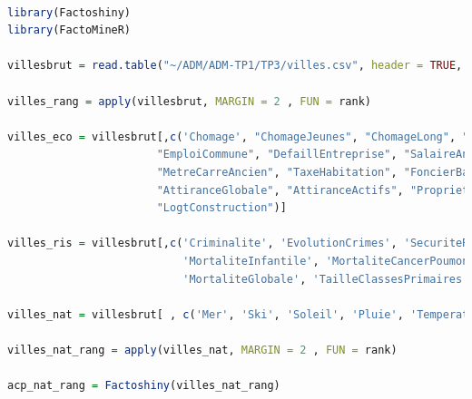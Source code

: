 \documentclass{article}
\begin{document}
\begin{lstlisting}[language=R]

library(Factoshiny)
library(FactoMineR)

villesbrut = read.table("~/ADM/ADM-TP1/TP3/villes.csv", header = TRUE, row.names=1)

villes_rang = apply(villesbrut, MARGIN = 2 , FUN = rank)

villes_eco = villesbrut[,c('Chomage', "ChomageJeunes", "ChomageLong", "EvoluEmploiCree", "Activite", "EmploiFeminin",
                       "EmploiCommune", "DefaillEntreprise", "SalaireAnnuel", "ImpotRevenu", "ImpotFortune", "Imposables",
                       "MetreCarreAncien", "TaxeHabitation", "FoncierBati", "MetreCubeEau", "EvolDemographique", "Vieillissement",
                       "AttiranceGlobale", "AttiranceActifs", "Proprietaires", "LogtSup4pieces", "LogtInsalubre", "LogtVacant",
                       "LogtConstruction")]

villes_ris = villesbrut[,c('Criminalite', 'EvolutionCrimes', 'SecuriteRoutiere', 'Inondations', 'TerrainsPollues', 'UsinesRisques',
                           'MortaliteInfantile', 'MortaliteCancerPoumon', 'MortaliteAlcool', 'DecesInfarctus', 'TauxSuicide',
                           'MortaliteGlobale', 'TailleClassesPrimaires', 'Retard6eme', 'Retard3eme', 'RetardTerminale')]

villes_nat = villesbrut[ , c('Mer', 'Ski', 'Soleil', 'Pluie', 'Temperature', 'MarcheAPied')]

villes_nat_rang = apply(villes_nat, MARGIN = 2 , FUN = rank)

acp_nat_rang = Factoshiny(villes_nat_rang)


\end{lstlisting}


 
\end{document}

